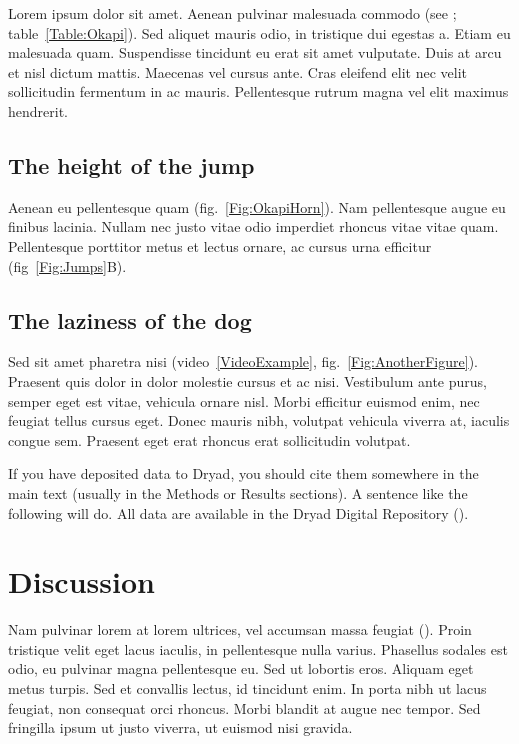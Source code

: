 \documentclass[11pt]{article}
\begin{document}
Lorem ipsum dolor sit amet. Aenean pulvinar malesuada commodo (see \citealt{DavisEtAl2011}; table~\ref{Table:Okapi}). Sed aliquet mauris odio, in tristique dui egestas a. Etiam eu malesuada quam. Suspendisse tincidunt eu erat sit amet vulputate. Duis at arcu et nisl dictum mattis. Maecenas vel cursus ante. Cras eleifend elit nec velit sollicitudin fermentum in ac mauris. Pellentesque rutrum magna vel elit maximus hendrerit.

\subsection*{The height of the jump}

Aenean eu pellentesque quam (fig.~\ref{Fig:OkapiHorn}). Nam pellentesque augue eu finibus lacinia. Nullam nec justo vitae odio imperdiet rhoncus vitae vitae quam. Pellentesque porttitor metus et lectus ornare, ac cursus urna efficitur (fig~\ref{Fig:Jumps}B).

\subsection*{The laziness of the dog}

Sed sit amet pharetra nisi (video~\ref{VideoExample}, fig.~\ref{Fig:AnotherFigure}). Praesent quis dolor in dolor molestie cursus et ac nisi. Vestibulum ante purus, semper eget est vitae, vehicula ornare nisl. Morbi efficitur euismod enim, nec feugiat tellus cursus eget. Donec mauris nibh, volutpat vehicula viverra at, iaculis congue sem. Praesent eget erat rhoncus erat sollicitudin volutpat.

If you have deposited data to Dryad, you should cite them somewhere in the main text (usually in the Methods or Results sections). A sentence like the following will do. All data are available in the Dryad Digital Repository (\citealt{CookEtAl2015}).

\section*{Discussion}

Nam pulvinar lorem at lorem ultrices, vel accumsan massa feugiat (\citealt{Ing11}). Proin tristique velit eget lacus iaculis, in pellentesque nulla varius. Phasellus sodales est odio, eu pulvinar magna pellentesque eu. Sed ut lobortis eros. Aliquam eget metus turpis. Sed et convallis lectus, id tincidunt enim. In porta nibh ut lacus feugiat, non consequat orci rhoncus. Morbi blandit at augue nec tempor. Sed fringilla ipsum ut justo viverra, ut euismod nisi gravida.
\end{document}
